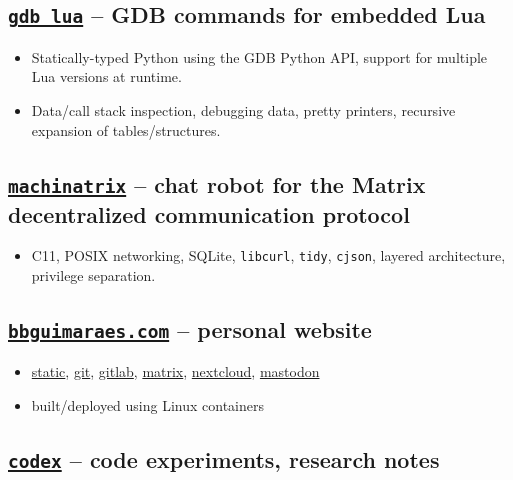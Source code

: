 \subsection*{
    \href{https://bbguimaraes.com/gdb_lua}{\texttt{gdb\_lua}}
    -- GDB commands for embedded Lua
}

\begin{itemize}
    \item
        Statically-typed Python using the GDB Python API, support for
        multiple Lua versions at runtime.
    \item
        Data\slash call stack inspection, debugging data, pretty printers,
        recursive expansion of tables\slash structures.
\end{itemize}

\subsection*{
    \href{https://bbguimaraes.com/machinatrix}{\texttt{machinatrix}}
    -- chat robot for the Matrix decentralized communication protocol
}

\begin{itemize}
    \item
        C11, POSIX networking, SQLite, \texttt{libcurl}, \texttt{tidy},
        \texttt{cjson}, layered architecture, privilege separation.
\end{itemize}

\subsection*{
    \href{https://bbguimaraes.com}{\texttt{bbguimaraes.com}}
    -- personal website
}

\begin{itemize}
    \item
        \href{https://bbguimaraes.com}{static},
        \href{https://git.bbguimaraes.com}{git},
        \href{https://gitlab.bbguimaraes.com}{gitlab},
        \href{https://matrix.bbguimaraes.com}{matrix},
        \href{https://nextcloud.bbguimaraes.com}{nextcloud},
        \href{https://mastodon.bbguimaraes.com}{mastodon}
    \item built\slash deployed using Linux containers
\end{itemize}

\subsection*{
    \href{https://bbguimaraes.com/codex}{\texttt{codex}}
    -- code experiments, research notes
}

